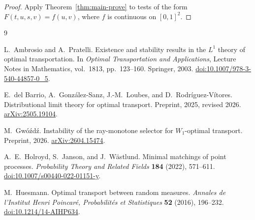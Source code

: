 \documentclass[11pt,reqno]{amsart}
\theoremstyle{definition}
\theoremstyle{remark}
\numberwithin{equation}{section}
\begin{document}
\begin{proof}
Apply Theorem~\ref{thm:main-prove} to tests of the form
\(F(t,u,s,v)=f(u,v)\), where \(f\) is continuous on \([0,1]^2\).
\end{proof}

\begin{thebibliography}{9}

L.~Ambrosio and A.~Pratelli.
Existence and stability results in the \(L^1\) theory of optimal transportation.
In \emph{Optimal Transportation and Applications},
Lecture Notes in Mathematics, vol.~1813, pp.~123--160.
Springer, 2003.
\href{https://doi.org/10.1007/978-3-540-44857-0_5}{doi:10.1007/978-3-540-44857-0\_5}.

E.~del Barrio, A.~Gonz\'alez-Sanz, J.-M.~Loubes, and
D.~Rodr\'iguez-V\'itores.
Distributional limit theory for optimal transport.
Preprint, 2025, revised 2026.
\href{https://arxiv.org/abs/2505.19104}{arXiv:2505.19104}.

M.~Gw\'{o}\'zd\'z.
Instability of the ray-monotone selector for \(W_1\)-optimal transport.
Preprint, 2026.
\href{https://arxiv.org/abs/2604.15474}{arXiv:2604.15474}.

A.~E.~Holroyd, S.~Janson, and J.~W\"astlund.
Minimal matchings of point processes.
\emph{Probability Theory and Related Fields} \textbf{184} (2022), 571--611.
\href{https://doi.org/10.1007/s00440-022-01151-y}{doi:10.1007/s00440-022-01151-y}.

M.~Huesmann.
Optimal transport between random measures.
\emph{Annales de l'Institut Henri Poincar\'e, Probabilit\'es et Statistiques}
\textbf{52} (2016), 196--232.
\href{https://doi.org/10.1214/14-AIHP634}{doi:10.1214/14-AIHP634}.

\end{thebibliography}
\end{document}
